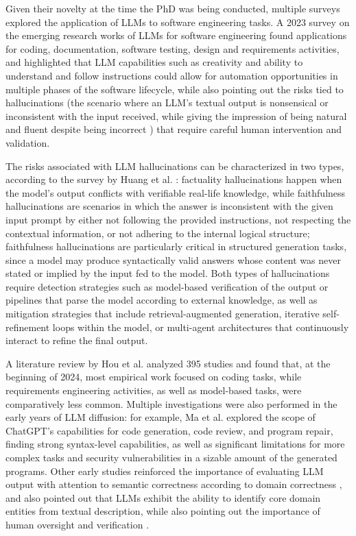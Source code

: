{{Given their novelty at the time the PhD was being conducted, multiple surveys explored the application of LLMs to software engineering tasks. A 2023 survey on the emerging research works of LLMs for software engineering \cite{fan2023large} found applications for coding, documentation, software testing, design and requirements activities, and highlighted that LLM capabilities such as creativity and ability to understand and follow instructions could allow for automation opportunities in multiple phases of the software lifecycle, while also pointing out the risks tied to hallucinations (the scenario where an LLM's textual output is nonsensical or inconsistent with the input received, while giving the impression of being natural and fluent despite being incorrect \cite{ji2023survey}) that require careful human intervention and validation.

The risks associated with LLM hallucinations can be characterized in two types, according to the survey by Huang et al. \cite{huang2025hallucination}: factuality hallucinations happen when the model's output conflicts with verifiable real-life knowledge, while faithfulness hallucinations are scenarios in which the answer is inconsistent with the given input prompt by either not following the provided instructions, not respecting the contextual information, or not adhering to the internal logical structure; faithfulness hallucinations are particularly critical in structured generation tasks, since a model may produce syntactically valid answers whose content was never stated or implied by the input fed to the model. Both types of hallucinations require detection strategies such as model-based verification of the output or pipelines that parse the model according to external knowledge, as well as mitigation strategies that include retrieval-augmented generation, iterative self-refinement loops within the model, or multi-agent architectures that continuously interact to refine the final output. 

A literature review by Hou et al. \cite{hou2023large} analyzed 395 studies and found that, at the beginning of 2024, most empirical work focused on coding tasks, while requirements engineering activities, as well as model-based tasks, were comparatively less common. Multiple investigations were also performed in the early years of LLM diffusion: for example, Ma et al. \cite{ma2023scope} explored the scope of ChatGPT's capabilities for code generation, code review, and program repair, finding strong syntax-level capabilities, as well as significant limitations for more complex tasks and security vulnerabilities in a sizable amount of the generated programs. Other early studies reinforced the importance of evaluating LLM output with attention to semantic correctness according to domain correctness \cite{ozkaya2023application}, and also pointed out that LLMs exhibit the ability to identify core domain entities from textual description, while also pointing out the importance of human oversight and verification \cite{belzner2023large}. 

}}
